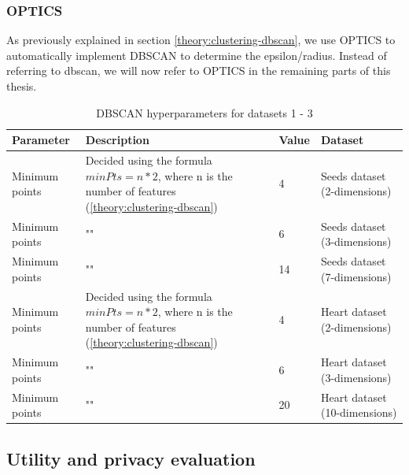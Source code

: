 \subsubsection{OPTICS}
As previously explained in section \ref{theory:clustering-dbscan}, we use OPTICS to automatically implement DBSCAN to determine the epsilon/radius.
Instead of referring to \gls{dbscan}, we will now refer to OPTICS in the remaining parts of this thesis.
\begin{table}[h]
  \begin{tabular}{|l|p{6cm}|l|l|}
    \hline
    Parameter      & Description                                                                                                    & Value & Dataset                       \\
    \hline
    Minimum points & Decided using the formula $minPts = n * 2$, where n is the number of features (\ref{theory:clustering-dbscan}) & 4     & Seeds dataset (2-dimensions)  \\
    \hline
    Minimum points & ""                                                                                                             & 6     & Seeds dataset (3-dimensions)  \\
    \hline
    Minimum points & ""                                                                                                             & 14    & Seeds dataset (7-dimensions)  \\
    \hline
    Minimum points & Decided using the formula $minPts = n * 2$, where n is the number of features (\ref{theory:clustering-dbscan}) & 4     & Heart dataset (2-dimensions)  \\
    \hline
    Minimum points & ""                                                                                                             & 6     & Heart dataset (3-dimensions)  \\
    \hline
    Minimum points & ""                                                                                                             & 20    & Heart dataset (10-dimensions) \\
    \hline
  \end{tabular}
  \caption{DBSCAN  hyperparameters for datasets 1 - 3}
  \label{tab:dbscan-formula-sklearn}
\end{table}

\newpage
\subsection{Utility and privacy evaluation}
